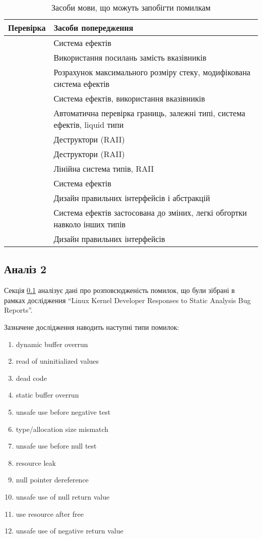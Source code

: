 \documentclass[main.tex]{subfiles}
\begin{document}
\begin{table}
  \tabulinesep=1mm
  \begin{tabu}{|c|X[l]|}
    \hline
    Перевірка & Засоби попередження \\
    \hline\hline
     & Система ефектів \\
     & Використання посилань замість вказівників \\
     & Розрахунок максимального розміру стеку, модифікована система ефектів \\
    \hline\hline
     & Система ефектів, використання вказівників \\
     & Автоматична перевірка границь, залежні типі, система ефектів, liquid типи \\
     & Деструктори (RAII) \\
     & Деструктори (RAII) \\
     & Лінійна система типів, RAII \\
    \hline\hline
     & Система ефектів \\
     & Дизайн правильних інтерфейсів і абстракцій \\
     & Система ефектів застосована до зміних, легкі обгортки навколо інших типів \\
     & Дизайн правильних інтерфейсів \\
    \hline
  \end{tabu}
  \caption{Засоби мови, що можуть запобігти помилкам}
  \label{linux-errors-mitigation}
\end{table}

\subsection{Аналіз 2}\label{linux-kernel-developer-responses-section}
Секція \ref{linux-kernel-developer-responses-section} аналізує дані про розповсюдженість помилок, що були зібрані в рамках дослідження ``Linux Kernel Developer Responses to Static Analysis Bug Reports''\cite{linux-kernel-developer-responses}.

Зазначене дослідження наводить наступні типи помилок:
\begin{enumerate}[nosep]
\item dynamic buffer overrun
\item read of uninitialized values
\item dead code
\item static buffer overrun
\item unsafe use before negative test
\item type/allocation size mismatch
\item unsafe use before null test
\item resource leak
\item null pointer dereference
\item unsafe use of null return value
\item use resource after free
\item unsafe use of negative return value
\end{enumerate}
\end{document}

